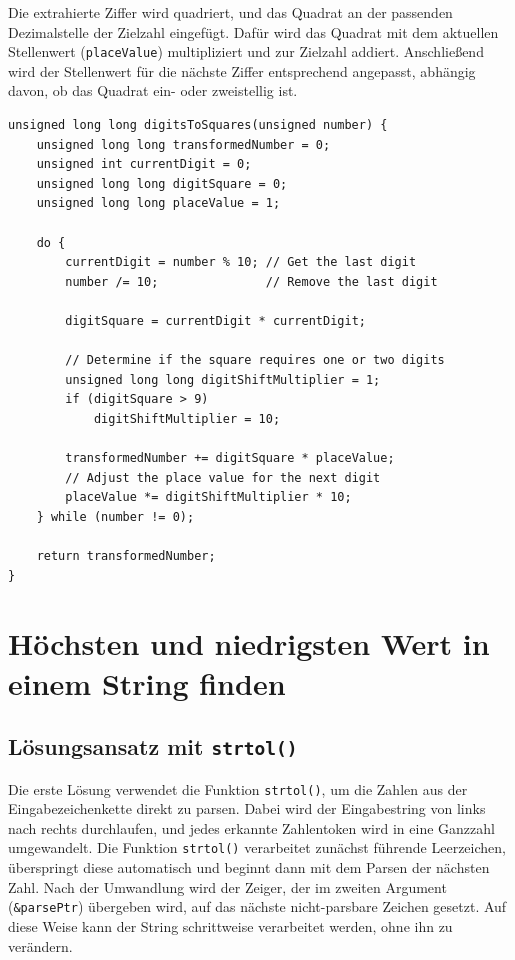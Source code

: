 Die extrahierte Ziffer wird quadriert, und das Quadrat an der passenden
Dezimalstelle der Zielzahl eingefügt. Dafür wird das Quadrat mit dem aktuellen
Stellenwert (\texttt{placeValue}) multipliziert und zur Zielzahl addiert.
Anschließend wird der Stellenwert für die nächste Ziffer entsprechend angepasst,
abhängig davon, ob das Quadrat ein- oder zweistellig ist.

\begin{verbatim}
unsigned long long digitsToSquares(unsigned number) {
    unsigned long long transformedNumber = 0;
    unsigned int currentDigit = 0;
    unsigned long long digitSquare = 0;
    unsigned long long placeValue = 1;

    do {
        currentDigit = number % 10; // Get the last digit
        number /= 10;               // Remove the last digit

        digitSquare = currentDigit * currentDigit;

        // Determine if the square requires one or two digits
        unsigned long long digitShiftMultiplier = 1;
        if (digitSquare > 9)
            digitShiftMultiplier = 10;

        transformedNumber += digitSquare * placeValue;
        // Adjust the place value for the next digit
        placeValue *= digitShiftMultiplier * 10;
    } while (number != 0);

    return transformedNumber;
}
\end{verbatim}





\chapter{Höchsten und niedrigsten Wert in einem String finden}

\section*{Lösungsansatz mit \texttt{strtol()}}

Die erste Lösung verwendet die Funktion \texttt{strtol()}, um die Zahlen
aus der Eingabezeichenkette direkt zu parsen. Dabei wird der Eingabestring von
links nach rechts durchlaufen, und jedes erkannte Zahlentoken wird in eine
Ganzzahl umgewandelt. Die Funktion \texttt{strtol()} verarbeitet zunächst
führende Leerzeichen, überspringt diese automatisch und beginnt dann mit dem
Parsen der nächsten Zahl. Nach der Umwandlung wird der Zeiger, der im zweiten
Argument (\texttt{&parsePtr}) übergeben wird, auf das nächste
nicht-parsbare Zeichen gesetzt. Auf diese Weise kann der String schrittweise
verarbeitet werden, ohne ihn zu verändern.

